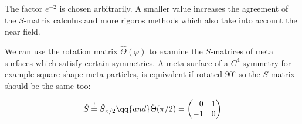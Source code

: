 The factor $e^{-2}$ is chosen arbitrarily. A smaller value increases the agreement of the $S$-matrix calculus and more rigoros methods which also  take into account the near field.

We can use the rotation matrix $\hat \Theta(\varphi)$ to examine the $S$-matrices of meta surfaces which satisfy certain symmetries. A meta surface of a $C^4$ symmetry for example square shape meta particles, is equivalent if rotated $90^\circ$ so the $S$-matrix should be the same too:

\begin{equation}
    \hat S \stackrel{!}{=} \hat S_{\pi/2} \qq{and}
    \hat \Theta(\pi/2) =
    \begin{pmatrix}
        \phantom{-} 0 & 1 \\
        -1 & 0
    \end{pmatrix}
\end{equation}
